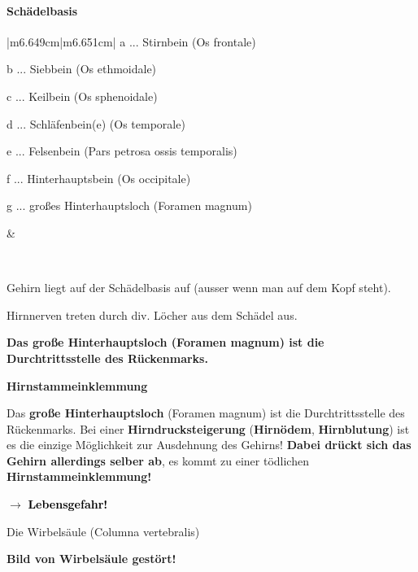 \documentclass{article}
\newcommand\gEs[1]{\textbf{\textcolor[rgb]{0.0,0.0,0.5019608}{#1}}}
\newcommand\gEs[1]{\textbf{\textcolor[rgb]{0.0,0.0,0.5019608}{#1}}}
\newcommand\gT[1]{\textbf{\textup{\textcolor[rgb]{0.0,0.5019608,0.0}{#1}}}}
\newcommand\gZ[1]{\textcolor[rgb]{0.5019608,0.5019608,0.5019608}{#1}}
\newcommand\gCa[1]{\textbf{\textcolor{black}{#1}}}
\begin{document}
\paragraph[Sch\"adelbasis]{Sch\"adelbasis}
\begin{center}
\tablehead{}\begin{supertabular}{|m{6.649cm}|m{6.651cm}|}
\hline
{\mdseries a ... Stirnbein \gZ{(Os frontale)}}

{\mdseries b ... Siebbein \gZ{(Os ethmoidale)}}

{\mdseries c ... Keilbein  \gZ{(Os sphenoidale)}}

{\mdseries d ... Schl\"afenbein(e)  \gZ{(Os
temporale)}}

{\mdseries e ... Felsenbein  \gZ{(Pars petrosa ossis
temporalis)}}

{\mdseries f ... Hinterhauptsbein  \gZ{(Os
occipitale)}}

{\mdseries g ... gro{\ss}es Hinterhauptsloch (Foramen magnum)}

 &
{\par}

\\\hline
\end{supertabular}
\end{center}
{\mdseries
Gehirn liegt auf der Sch\"adelbasis auf \gZ{(ausser
wenn man auf dem Kopf steht)}. }

{\mdseries
Hirnnerven treten durch div. L\"ocher aus dem Sch\"adel aus.}

{\mdseries
\textbf{Das gro{\ss}e Hinterhauptsloch (Foramen magnum) ist die
Durchtrittsstelle des R\"uckenmarks.} }

{\mdseries\color{black}
\gT{Hirnstammeinklemmung}}

{\mdseries\color{black}
Das \gEs{gro{\ss}e Hinterhauptsloch} (Foramen magnum)
ist die Durchtrittsstelle des R\"uckenmarks. Bei einer
\gEs{Hirndrucksteigerung}
(\gEs{Hirn\"odem},
\gEs{Hirnblutung}) ist es die einzige M\"oglichkeit
zur Ausdehnung des Gehirns! \gEs{Dabei dr\"uckt sich
das Gehirn allerdings selber ab}, es kommt zu einer t\"odlichen
\gEs{Hirnstammeinklemmung!} }

{\mdseries\color{black}
${\rightarrow}$ \gCa{ Lebensgefahr! } }

{\mdseries\color[rgb]{0.0,0.0,0.5019608}
Die Wirbels\"aule (Columna vertebralis)}

{\bfseries\color[rgb]{0.5019608,0.0,0.0}
Bild von Wirbels\"aule gest\"ort!}
\end{document}
